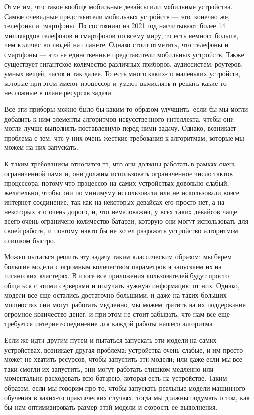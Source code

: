 \documentclass[oneside,final,12pt]{extreport}
\begin{document}
Отметим, что такое вообще мобильные девайсы или мобильные устройства. Самые очевидные представители мобильных устройств — это, конечно же, телефоны и смартфоны. По состоянию на 2021 год насчитывают более 14 миллиардов телефонов и смартфонов по всему миру, то есть немного больше, чем количество людей на планете. 
Однако стоит отметить, что телефоны и смартфоны — это не единственные представители мобильных устройств. Также существует гигантское количество различных приборов, аудиосистем, роутеров, умных вещей, часов и так далее. То есть много каких-то маленьких устройств, которые при этом имеют процессор и умеют вычислять и решать какие-то несложные в плане ресурсов задачи.
 
Все эти приборы можно было бы каким-то образом улучшить, если бы мы могли добавить к ним элементы алгоритмов искусственного интеллекта, чтобы они могли лучше выполнять поставленную перед ними задачу. Однако, возникает проблема с тем, что у них очень жесткие требования к алгоритмам, которые мы можем на них запускать. 

К таким требованиям относится то, что они должны работать в рамках очень ограниченной памяти, они должны использовать ограниченное число тактов процессора, потому что процессор на самих устройствах довольно слабый, желательно, чтобы они по минимуму использовали или не использовали вовсе интернет-соединение, так как на некоторых девайсах его просто нет, а на некоторых это очень дорого, и, что немаловажно, у всех таких девайсов чаще всего очень ограничено количество батареи, которую они могут использовать для своей работы, и поэтому никто бы не хотел разряжать устройство алгоритмом слишком быстро. 
 
Можно пытаться решить эту задачу таким классическим образом: мы берем большие модели с огромным количеством параметров и запускаем их на гигантских кластерах. В итоге все приложения пользователей будут просто общаться с этими серверами и получать нужную информацию от них. Однако, модели все еще остались достаточно большими, и даже на таких больших мощностях они могут работать медленно, мы можем тратить на их поддержание огромное количество денег, и при этом не стоит забывать, что нам все еще требуется интернет-соединение для каждой работы нашего алгоритма. 

Если же идти другим путем и пытаться запускать эти модели на самих устройствах, возникает другая проблема: устройства очень слабые, и им просто может не хватить ресурсов, чтобы запустить эти модели; или даже если мы все-таки смогли их запустить, они могут работать слишком медленно или моментально расходовать всю батарею, которая есть на устройстве. Таким образом, если мы говорим про то, чтобы запускать реальные модели машинного обучения в каких-то практических случаях, тогда мы должны подумать о том, как бы нам оптимизировать размер этой модели и скорость ее выполнения.
 
\end{document}

